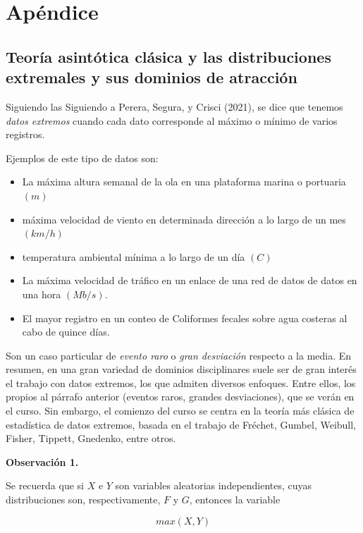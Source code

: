 \documentclass[
  oneside]{article}
\begin{document}
\section{Apéndice}\label{sec:Ap}
\subsection{Teoría asintótica clásica y las distribuciones extremales y sus dominios de atracción}\label{subsec:ch1}

Siguiendo las Siguiendo a Perera, Segura, y Crisci (2021), se dice que
tenemos \textit{datos extremos} cuando cada dato corresponde al máximo o
mínimo de varios registros.

Ejemplos de este tipo de datos son:

\begin{itemize}
\item La máxima altura semanal de la ola en una plataforma marina o portuaria $(m)$
\item máxima velocidad de viento en determinada dirección a lo largo de un mes $(km/h)$
\item temperatura ambiental mínima a lo largo de un día $(C)$
\item La máxima velocidad de tráfico en un enlace de una red de datos de datos en una hora $(Mb/s)$.
\item El mayor registro en un conteo de Coliformes fecales sobre agua costeras al cabo de quince días.
\end{itemize}

Son un caso particular de \textit{evento raro} o
\textit{gran desviación} respecto a la media. En resumen, en una gran
variedad de dominios disciplinares suele ser de gran interés el trabajo
con datos extremos, los que admiten diversos enfoques. Entre ellos, los
propios al párrafo anterior (eventos raros, grandes desviaciones), que
se verán en el curso. Sin embargo, el comienzo del curso se centra en la
teoría más clásica de estadística de datos extremos, basada en el
trabajo de Fréchet, Gumbel, Weibull, Fisher, Tippett, Gnedenko, entre
otros.

\textbf{Observación 1.}

Se recuerda que si \(X\) e \(Y\) son variables aleatorias
independientes, cuyas distribuciones son, respectivamente, \(F\) y
\(G\), entonces la variable

\begin{equation}
max(X,Y)
\end{equation}
\end{document}
